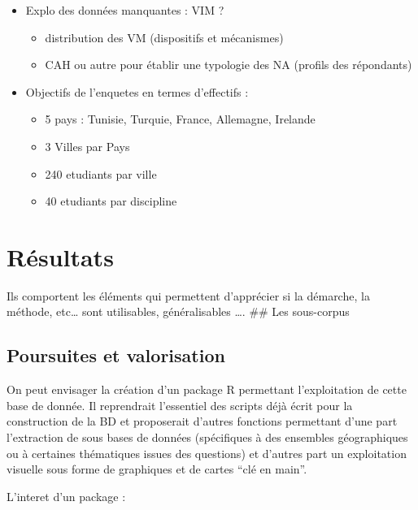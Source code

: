 \documentclass[
  12pt,
  a4paperpaper,
]{book}
\providecommand{\tightlist}{%
  \setlength{\itemsep}{0pt}\setlength{\parskip}{0pt}}\usepackage{longtable,booktabs,array}
\begin{document}
\begin{itemize}
\tightlist
\item
  Explo des données manquantes : VIM ?

  \begin{itemize}
  \tightlist
  \item
    distribution des VM (dispositifs et mécanismes)
  \item
    CAH ou autre pour établir une typologie des NA (profils des
    répondants)
  \end{itemize}
\item
  Objectifs de l'enquetes en termes d'effectifs :

  \begin{itemize}
  \tightlist
  \item
    5 pays : Tunisie, Turquie, France, Allemagne, Irelande
  \item
    3 Villes par Pays
  \item
    240 etudiants par ville
  \item
    40 etudiants par discipline
  \end{itemize}
\end{itemize}


\hypertarget{ruxe9sultats}{%
\chapter{Résultats}\label{ruxe9sultats}}

Ils comportent les éléments qui permettent d'apprécier si la démarche,
la méthode, etc\ldots{} sont utilisables, généralisables \ldots. \#\#
Les sous-corpus

\hypertarget{poursuites-et-valorisation}{%
\section{Poursuites et valorisation}\label{poursuites-et-valorisation}}

On peut envisager la création d'un package R permettant l'exploitation
de cette base de donnée. Il reprendrait l'essentiel des scripts déjà
écrit pour la construction de la BD et proposerait d'autres fonctions
permettant d'une part l'extraction de sous bases de données (spécifiques
à des ensembles géographiques ou à certaines thématiques issues des
questions) et d'autres part un exploitation visuelle sous forme de
graphiques et de cartes ``clé en main''.

L'interet d'un package :
\end{document}
